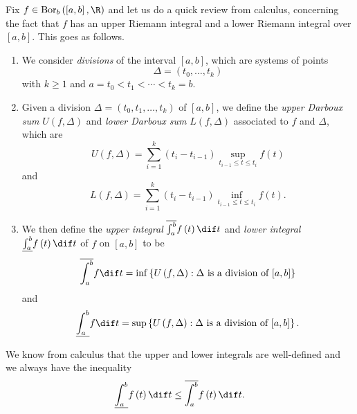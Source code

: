 \documentclass[pmath450]{subfiles}
\begin{document}
    \np Fix $f\in\bor_b\left( \left[ a,b \right],\R \right)$ and let us do a quick review from calculus, concerning the fact that $f$ has an upper Riemann integral and a lower Riemann integral over $\left[ a,b \right]$. This goes as follows.
    \begin{enumerate}
        \item We consider \textit{divisions} of the interval $\left[ a,b \right]$, which are systems of points
            \begin{equation*}
                \Delta = \left( t_0,\ldots,t_k \right)
            \end{equation*}
            with $k\geq 1$ and $a=t_0<t_1<\cdots<t_k=b$.
        \item Given a division $\Delta=\left( t_0,t_1,\ldots,t_k \right)$ of $\left[ a,b \right]$, we define the \textit{upper Darboux sum} $U\left( f,\Delta \right)$ and \textit{lower Darboux sum} $L\left( f,\Delta \right)$ associated to $f$ and $\Delta$, which are
            \begin{equation*}
                U\left( f,\Delta \right) = \sum^{k}_{i=1} \left( t_i-t_{i-1} \right)\sup_{t_{i-1}\leq t\leq t_i}f\left( t \right)
            \end{equation*}
            and
            \begin{equation*}
                L\left( f,\Delta \right) = \sum^{k}_{i=1} \left( t_i-t_{i-1} \right)\inf_{t_{i-1}\leq t\leq t_i}f\left( t \right).
            \end{equation*}
        \item We then define the \textit{upper integral} $\overline{\int^b_a}f\left( t \right)\dif t$ and \textit{lower integral} $\underline{\int^b_a}f\left( t \right)\dif t$ of $f$ on $\left[ a,b \right]$ to be
            \begin{equation*}
                \overline{\int_{a}^b}f\dif t = \inf\left\lbrace U\left( f,\Delta \right): \Delta\text{ is a division of $\left[ a,b \right]$} \right\rbrace
            \end{equation*}
            and
            \begin{equation*}
                \underline{\int_{a}^b}f\dif t = \sup\left\lbrace U\left( f,\Delta \right): \Delta\text{ is a division of $\left[ a,b \right]$} \right\rbrace.
            \end{equation*}
    \end{enumerate}
    We know from calculus that the upper and lower integrals are well-defined and we always have the inequality
    \begin{equation}
        \underline{\int_{a}^b}f\left( t \right)\dif t \leq \overline{\int_{a}^b}f\left( t \right)\dif t.
    \end{equation}
\end{document}
